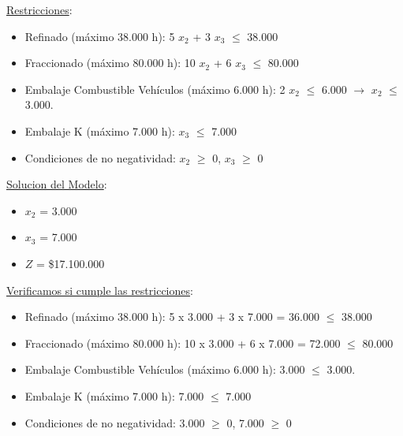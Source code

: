 \documentclass[10pt,a4paper]{article}
\begin{document}
\begin{enumerate}[label=\textbf{\sffamily\large\arabic*.}]
\begin{center}
    \end{center}

    \underline{Restricciones}: 

    \begin{itemize}

        \item Refinado (máximo 38.000 h):  5 $x_{2}$ + 3 $x_{3}$ $\leq$ 38.000
        \item Fraccionado (máximo 80.000 h): 10 $x_{2}$ + 6 $x_{3}$ $\leq$ 80.000
        \item Embalaje Combustible Vehículos (máximo 6.000 h): 2 $x_{2}$ $\leq$ 6.000 $\rightarrow$ $x_{2}$ $\leq$ 3.000.
        \item Embalaje K (máximo 7.000 h): $x_{3}$ $\leq$ 7.000
        \item Condiciones de no negatividad: $x_{2}$  $\geq$ 0, $x_{3}$ $\geq$ 0\\

    \end{itemize}

    \underline{Solucion del Modelo}: 

    \begin{itemize}

        \item $x_{2}$ = 3.000
        \item $x_{3}$ = 7.000
        \item $Z$ = \$17.100.000\\

    \end{itemize}

    \underline{Verificamos si cumple las restricciones}:

    \begin{itemize}

        \item Refinado (máximo 38.000 h):  5 x 3.000 + 3 x 7.000 = 36.000 $\leq$ 38.000
        \item Fraccionado (máximo 80.000 h): 10 x 3.000 + 6 x 7.000 = 72.000 $\leq$ 80.000
        \item Embalaje Combustible Vehículos (máximo 6.000 h): 3.000 $\leq$ 3.000.
        \item Embalaje K (máximo 7.000 h): 7.000 $\leq$ 7.000
        \item Condiciones de no negatividad: 3.000  $\geq$ 0, 7.000 $\geq$ 0\\

    \end{itemize}


\end{enumerate}
\end{document}
